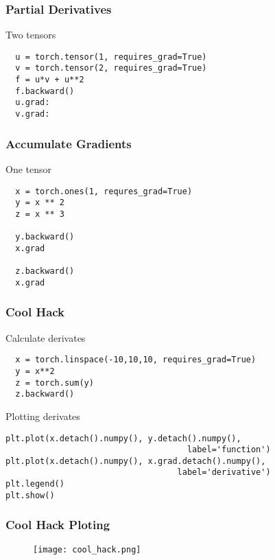 \documentclass[14 pt]{beamer}
\begin{document}
\begin{frame}[fragile]
  \frametitle{Partial Derivatives}
  \begin{block}{Two tensors}
\begin{verbatim}
  u = torch.tensor(1, requires_grad=True) 
  v = torch.tensor(2, requires_grad=True) 
  f = u*v + u**2
  f.backward() 
  u.grad:  
  v.grad:
\end{verbatim} 
  \end{block}
\end{frame}

\begin{frame}[fragile]
  \frametitle{Accumulate Gradients}
  \begin{block}{One tensor}
\begin{verbatim}
  x = torch.ones(1, requres_grad=True)
  y = x ** 2
  z = x ** 3

  y.backward()
  x.grad

  z.backward()
  x.grad
\end{verbatim}
  \end{block}
\end{frame}

\begin{frame}[fragile]
\footnotesize{
  \frametitle{Cool Hack}
  \begin{block}{Calculate derivates}
\begin{verbatim}
  x = torch.linspace(-10,10,10, requires_grad=True)
  y = x**2 
  z = torch.sum(y)
  z.backward()
\end{verbatim}
  \end{block}
  \begin{block}{Plotting derivates}
\begin{verbatim}
plt.plot(x.detach().numpy(), y.detach().numpy(),
                                     label='function')
plt.plot(x.detach().numpy(), x.grad.detach().numpy(), 
                                   label='derivative')
plt.legend()
plt.show()
\end{verbatim}
  \end{block}
}
\end{frame}

\begin{frame}
    \frametitle{Cool Hack Ploting}
    \begin{figure}
      \centering
      \texttt{[image: cool\_hack.png]}
    \end{figure}
\end{frame}
\end{document}

